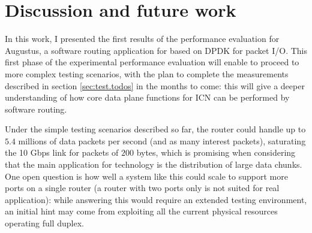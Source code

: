 \documentclass[11pt,a4paper,twoside,titlepage,openany]{book}
\begin{document}
\chapter{Discussion and future work}
\label{chap:conclusions}

In this work, I presented the first results of the performance evaluation for Augustus, a software routing application for  based on DPDK for packet I/O.
This first phase of the experimental performance evaluation will enable to proceed to more complex testing scenarios, with the plan to complete the measurements described in section \ref{sec:test.todos} in the months to come: this will give a deeper understanding of how core data plane functions for \gls{ICN} can be performed by software routing.

Under the simple testing scenarios described so far, the router could handle up to $5.4$ millions of data packets per second (and as many interest packets), saturating the 10 Gbps link for packets of $200$ bytes, which is promising when considering that the main application for technology is the distribution of large data chunks.
One open question is how well a system like this could scale to support more ports on a single router (a router with two ports only is not suited for real application): while answering this would require an extended testing environment, an initial hint may come from exploiting all the current physical resources operating full duplex.


\end{document}
